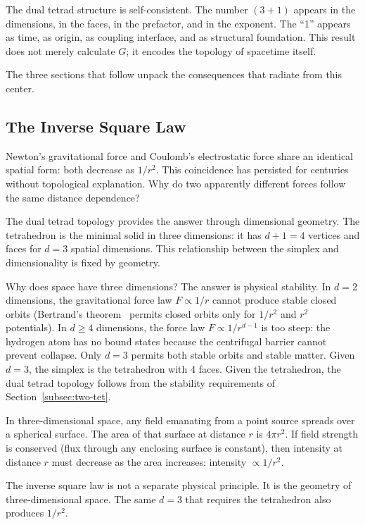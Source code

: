 \documentclass[aps,prd,preprint,superscriptaddress,showpacs,preprintnumbers,amsmath,amssymb,nofootinbib]{revtex4-2}
\begin{document}
The dual tetrad structure is self-consistent. The number $(3{+}1)$ appears in the dimensions, in the faces, in the prefactor, and in the exponent. The ``1'' appears as time, as origin, as coupling interface, and as structural foundation. This result does not merely calculate $G$; it encodes the topology of spacetime itself.

The three sections that follow unpack the consequences that radiate from this center.

\subsection{The Inverse Square Law}
\label{subsec:inverse-square}

Newton's gravitational force and Coulomb's electrostatic force share an identical spatial form: both decrease as $1/r^2$. This coincidence has persisted for centuries without topological explanation. Why do two apparently different forces follow the same distance dependence?

The dual tetrad topology provides the answer through dimensional geometry. The tetrahedron is the minimal solid in three dimensions: it has $d + 1 = 4$ vertices and faces for $d = 3$ spatial dimensions. This relationship between the simplex and dimensionality is fixed by geometry.

Why does space have three dimensions? The answer is physical stability. In $d = 2$ dimensions, the gravitational force law $F \propto 1/r$ cannot produce stable closed orbits (Bertrand's theorem~\cite{goldstein2002} permits closed orbits only for $1/r^2$ and $r^2$ potentials). In $d \geq 4$ dimensions, the force law $F \propto 1/r^{d-1}$ is too steep: the hydrogen atom has no bound states because the centrifugal barrier cannot prevent collapse. Only $d = 3$ permits both stable orbits and stable matter. Given $d = 3$, the simplex is the tetrahedron with 4 faces. Given the tetrahedron, the dual tetrad topology follows from the stability requirements of Section~\ref{subsec:two-tet}.

In three-dimensional space, any field emanating from a point source spreads over a spherical surface. The area of that surface at distance $r$ is $4\pi r^2$. If field strength is conserved (flux through any enclosing surface is constant), then intensity at distance $r$ must decrease as the area increases: intensity $\propto 1/r^2$.

The inverse square law is not a separate physical principle. It is the geometry of three-dimensional space. The same $d = 3$ that requires the tetrahedron also produces $1/r^2$.
\end{document}
